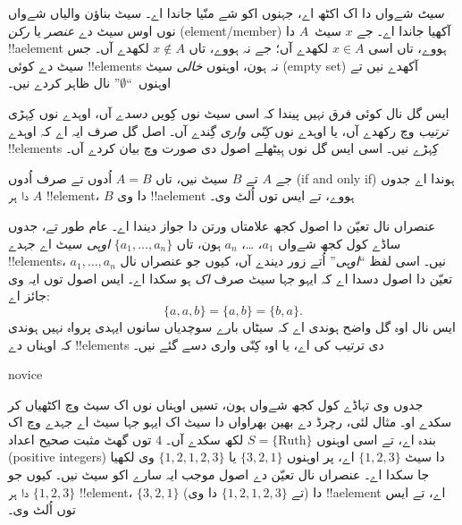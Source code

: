 \documentclass[../../../include/open-logic-section]{subfiles}
\begin{document}

\emph{سیٹ} شےواں دا اک اکٹھ اے، جہنوں {اکو} شے منّیا جاندا اے۔ سیٹ بناؤن والیاں
شےواں نوں اوس سیٹ دے \emph{عنصر} یا \emph{رکن} (element/member) آکھیا جاندا
اے۔ جے $x$ سیٹ~$A$ دا
!!a{element} ہووے، تاں اسی $x \in A$ لکھدے آں؛ جے نہ ہووے، تاں $x \notin A$
لکھدے آں۔ جس سیٹ دے کوئی !!{element}s نہ ہون، اوہنوں \emph{خالی} سیٹ
(empty set) آکھدے نیں
تے اوہنوں~``$\emptyset$'' نال ظاہر کردے نیں۔

\begin{explain}
ایس گل نال کوئی فرق نہیں پیندا کہ اسی سیٹ نوں کِویں \emph{دسدے} آں، اوہدے
 نوں کِہڑی \emph{ترتیب} وچ رکھدے آں، یا اوہدے  نوں
\emph{کِنّی واری} گِندے آں۔ اصل گل صرف ایہ اے کہ اوہدے !!{element}s کِہڑے نیں۔
اسی ایس گل نوں ہِیٹھلے اصول دی صورت وچ بیان کردے آں۔
\end{explain}

\begin{defn}
  جے $A$ تے $B$ سیٹ نیں، تاں $A = B$ اُدوں تے صرف اُدوں
  (if and only if) ہوندا اے جدوں
  $A$ دا ہر !!{element}، $B$ دا وی !!a{element} ہووے، تے ایس توں اُلٹ وی۔
\end{defn}

عنصراں نال تعیّن دا اصول کجھ علامتاں ورتن دا جواز دیندا اے۔ عام طور تے، جدوں
ساڈے کول کجھ شےواں $a_{1}$، \dots، $a_{n}$ ہون، تاں $\{a_{1}, \dots, a_{n}\}$
\emph{اوہی} سیٹ اے جہدے !!{element}s، $a_1, \ldots, a_n$ نیں۔ اسی لفظ
``\emph{اوہی}'' اُتے زور دیندے آں، کیوں جو عنصراں نال تعیّن دا اصول دسدا اے کہ
ایہو جہا سیٹ صرف \emph{اک} ہو سکدا اے۔ ایس اصول توں ایہ وی جائز اے:
  \[
    \{a, a, b\} = \{a, b\} = \{b,a\}.
  \]
ایس نال اوہ گل واضح ہوندی اے کہ سیٹاں بارے سوچدیاں سانوں ایہدی پرواہ نہیں
ہوندی کہ اوہناں دے !!{element}s دی ترتیب کی اے، یا اوہ کِنّی واری دسے گئے نیں۔

\begin{tagblock}{novice}
\begin{ex}
جدوں وی تہاڈے کول کجھ شےواں ہون، تسیں اوہناں نوں اک سیٹ وچ اکٹھیاں کر سکدے او۔
مثال لئی، رچرڈ دے بھین بھراواں دا سیٹ اک ایہو جہا سیٹ اے جہدے وچ اک بندہ اے،
تے اسی اوہنوں $S=\{\textrm{Ruth}\}$ لکھ سکدے آں۔ $4$ توں گھٹ مثبت صحیح
اعداد (positive integers) دا سیٹ $\{1, 2, 3\}$ اے، پر اوہنوں $\{3, 2, 1\}$ یا
$\{1, 2, 1, 2, 3\}$ وی لکھیا جا سکدا اے۔ عنصراں نال تعیّن دے اصول موجب ایہ
سارے اکو سیٹ نیں۔ کیوں جو $\{1, 2, 3\}$ دا ہر !!{element}،
$\{3, 2, 1\}$ دا (تے $\{1, 2, 1, 2, 3\}$ دا وی) !!a{element} اے، تے ایس
توں اُلٹ وی۔
\end{ex}
\end{tagblock}
\end{document}
